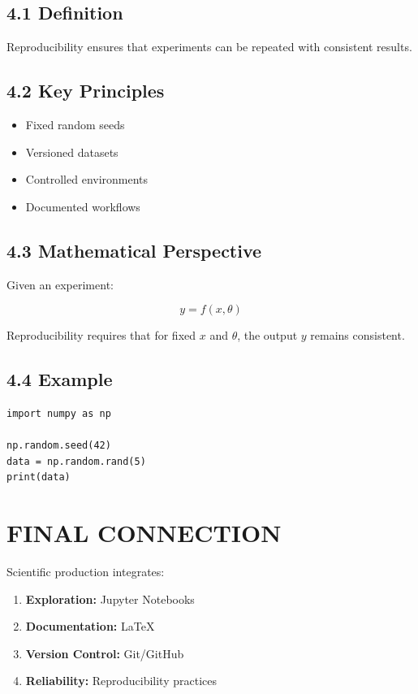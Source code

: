 \subsection*{4.1 Definition}

Reproducibility ensures that experiments can be repeated with consistent results.

\subsection*{4.2 Key Principles}

\begin{itemize}
\item Fixed random seeds
\item Versioned datasets
\item Controlled environments
\item Documented workflows
\end{itemize}

\subsection*{4.3 Mathematical Perspective}

Given an experiment:

\[
y = f(x, \theta)
\]

Reproducibility requires that for fixed $x$ and $\theta$, the output $y$ remains consistent.

\subsection*{4.4 Example}

\begin{verbatim}
import numpy as np

np.random.seed(42)
data = np.random.rand(5)
print(data)
\end{verbatim}

\vspace{0.5cm}

\section*{FINAL CONNECTION}

Scientific production integrates:

\begin{enumerate}
\item \textbf{Exploration:} Jupyter Notebooks
\item \textbf{Documentation:} LaTeX
\item \textbf{Version Control:} Git/GitHub
\item \textbf{Reliability:} Reproducibility practices
\end{enumerate}

